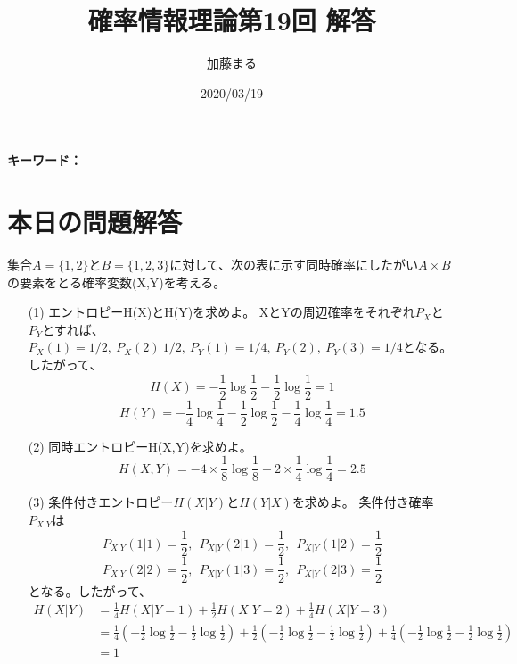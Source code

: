 \documentclass[a4j,uplatex,dvipdfmx]{jsarticle}
\title{確率情報理論第19回 解答}
\author{加藤まる}
\date{2020/03/19}
\begin{document}
\maketitle
\bf キーワード：
\rm

\section*{本日の問題解答}
集合$A=\{ 1,2\}$と$B=\{ 1,2,3 \}$に対して、次の表に示す同時確率にしたがい$A \times B$の要素をとる確率変数(X,Y)を考える。
\begin{itemize}
  \item[(1)]エントロピーH(X)とH(Y)を求めよ。
  XとYの周辺確率をそれぞれ$P_X$と$P_Y$とすれば、$P_X(1)=1/2,~P_X(2)~1/2,~P_Y(1)=1/4,~P_Y(2),~P_Y(3)=1/4$となる。
  したがって、
  \begin{equation}
    H(X)=-\frac{1}{2}\log{\frac{1}{2}}-\frac{1}{2}\log{\frac{1}{2}}=1
  \end{equation} 
  \begin{equation}
    H(Y)=-\frac{1}{4}\log{\frac{1}{4}}-\frac{1}{2}\log{\frac{1}{2}}-\frac{1}{4}\log{\frac{1}{4}}=1.5
  \end{equation} 
  \item[(2)]同時エントロピーH(X,Y)を求めよ。
  \begin{equation}
    H(X,Y)=-4\times \frac{1}{8}\log{\frac{1}{8}}-2\times \frac{1}{4}\log{\frac{1}{4}}=2.5
  \end{equation} 
  \item[(3)]条件付きエントロピー$H(X|Y)$と$H(Y|X)$を求めよ。
  条件付き確率$P_{X|Y}$は
  \begin{equation}
    P_{X|Y}(1|1)=\frac{1}{2},~~P_{X|Y}(2|1)=\frac{1}{2},~~P_{X|Y}(1|2)=\frac{1}{2}
  \end{equation} 
  \begin{equation}
    P_{X|Y}(2|2)=\frac{1}{2},~~P_{X|Y}(1|3)=\frac{1}{2},~~P_{X|Y}(2|3)=\frac{1}{2}
  \end{equation}
  となる。したがって、
  \begin{equation}
    \begin{split}
      H(X|Y)&=\frac{1}{4}H(X|Y=1)+\frac{1}{2}H(X|Y=2)+\frac{1}{4}H(X|Y=3)\\
      &=\frac{1}{4}\left( -\frac{1}{2}\log{\frac{1}{2}}-\frac{1}{2}\log{\frac{1}{2}} \right)+\frac{1}{2}\left( -\frac{1}{2}\log{\frac{1}{2}}-\frac{1}{2}\log{\frac{1}{2}} \right)+\frac{1}{4}\left( -\frac{1}{2}\log{\frac{1}{2}}-\frac{1}{2}\log{\frac{1}{2}} \right)\\
      &=1

\end{split}
\end{equation}
\end{itemize}
\end{document}
